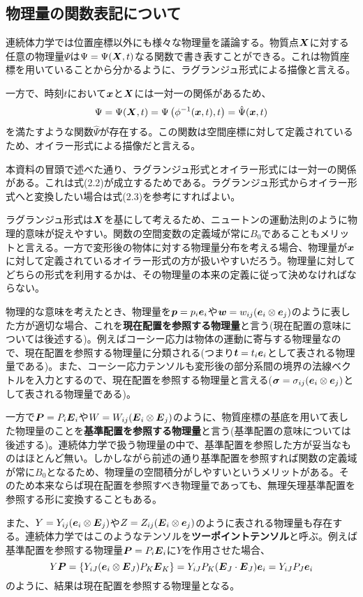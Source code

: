 \documentclass[dvipdfmx, 9pt, a4paper]{jsarticle}
\numberwithin{equation}{section}
\newcommand{\bm}[1]{{\mbox{\boldmath $#1$}}}
\begin{document}
\subsection{物理量の関数表記について}
連続体力学では位置座標以外にも様々な物理量を議論する。物質点$\bm X$に対する任意の物理量$\Psi$は$\Psi=\Psi(\bm X, t)$なる関数で書き表すことができる。これは物質座標を用いていることから分かるように、ラグランジュ形式による描像と言える。\par
一方で、時刻$t$において$\bm x$と$\bm X$には一対一の関係があるため、
\begin{equation}
\Psi=\Psi(\bm X, t)=\Psi\left(\phi^{-1}(\bm x, t), t\right)=\hat{\Psi}(\bm x, t)
\end{equation}
を満たすような関数$\hat{\Psi}$が存在する。この関数は空間座標に対して定義されているため、オイラー形式による描像だと言える。\par
本資料の冒頭で述べた通り、ラグランジュ形式とオイラー形式には一対一の関係がある。これは式(2.2)が成立するためである。ラグランジュ形式からオイラー形式へと変換したい場合は式(2.3)を参考にすればよい。\par
ラグランジュ形式は$\bm X$を基にして考えるため、ニュートンの運動法則のように物理的意味が捉えやすい。関数の空間変数の定義域が常に$B_0$であることもメリットと言える。一方で変形後の物体に対する物理量分布を考える場合、物理量が$\bm x$に対して定義されているオイラー形式の方が扱いやすいだろう。物理量に対してどちらの形式を利用するかは、その物理量の本来の定義に従って決めなければならない。\par
物理的な意味を考えたとき、物理量を$\bm p=p_i\bm e_i$や$\bm w=w_{ij}(\bm e_i \otimes \bm e_j)$のように表した方が適切な場合、これを{\bf 現在配置を参照する物理量}と言う(現在配置の意味については後述する)。例えばコーシー応力は物体の運動に寄与する物理量なので、現在配置を参照する物理量に分類される(つまり$\bm t=t_i\bm e_i$として表される物理量である)。また、コーシー応力テンソルも変形後の部分系間の境界の法線ベクトルを入力とするので、現在配置を参照する物理量と言える($\bm \sigma=\sigma_{ij}(\bm e_i \otimes \bm e_j)$として表される物理量である)。\par
一方で$\bm P=P_i \bm E_i$や$W=W_{ij}(\bm E_i \otimes \bm E_j)$のように、物質座標の基底を用いて表した物理量のことを{\bf 基準配置を参照する物理量}と言う(基準配置の意味については後述する)。連続体力学で扱う物理量の中で、基準配置を参照した方が妥当なものはほとんど無い。しかしながら前述の通り基準配置を参照すれば関数の定義域が常に$B_0$となるため、物理量の空間積分がしやすいというメリットがある。そのため本来ならば現在配置を参照すべき物理量であっても、無理矢理基準配置を参照する形に変換することもある。\par
また、$Y=Y_{ij}(\bm e_i \otimes \bm E_j)$や$Z=Z_{ij}(\bm E_i \otimes \bm e_j)$のように表される物理量も存在する。連続体力学ではこのようなテンソルを{\bf ツーポイントテンソル}と呼ぶ。例えば基準配置を参照する物理量$\bm P=P_i\bm E_i$に$Y$を作用させた場合、
\begin{equation}
Y\bm P=\{Y_{iJ}(\bm e_i \otimes \bm E_J) P_K\bm E_K \}=Y_{iJ}P_K(\bm E_J \cdot \bm E_J)\bm e_i=Y_{iJ}P_J\bm e_i \notag
\end{equation}
のように、結果は現在配置を参照する物理量となる。
\end{document}
